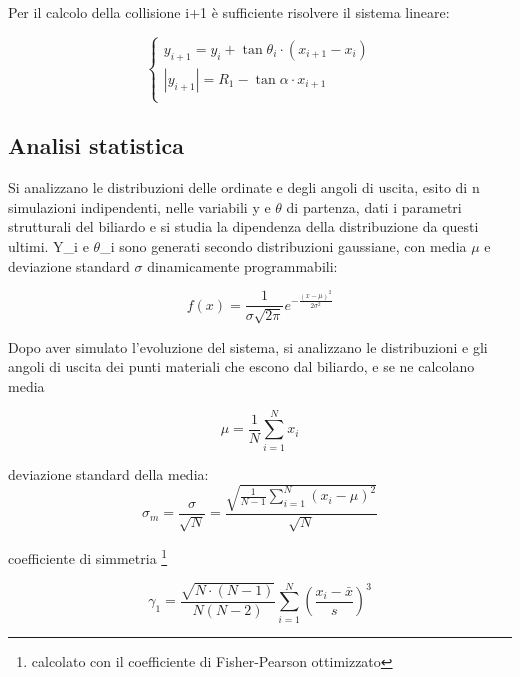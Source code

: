 \documentclass{article}
\begin{document}
Per il calcolo della collisione i+1 è sufficiente risolvere il sistema lineare:

\begin{equation}
\left\{
\begin{aligned}
    y_{i+1}=y_i+\tan\theta_i \cdot (x_{i+1}-x_i) \\
    |y_{i+1}|= R_1 - \tan\alpha \cdot x_{i+1}
\\
\end{aligned}
\right.
\end{equation}

\subsection{Analisi statistica}

Si analizzano le distribuzioni delle ordinate e degli angoli di uscita, esito di n simulazioni indipendenti, nelle variabili y e \(\theta\) di partenza, dati i parametri strutturali del biliardo e si studia la dipendenza della distribuzione da questi ultimi.
Y\_i e \(\theta\)\_i sono generati secondo distribuzioni gaussiane, con media \(\mu\) e deviazione standard \(\sigma\) dinamicamente programmabili:

\begin{equation}
    f(x) = \frac{1}{\sigma\sqrt{2\pi}} e^{-\frac{(x-\mu)^2}{2\sigma^2}}
\end{equation}

Dopo aver simulato l'evoluzione del sistema, si analizzano le distribuzioni e gli angoli di uscita dei punti materiali che escono dal biliardo, e se ne calcolano media

\begin{equation}
    \mu = \frac{1}{N} \sum_{i=1}^N x_i
\end{equation}

deviazione standard della media:
\begin{equation}
    \sigma_m = \frac{\sigma}{\sqrt{N}} = \frac{\sqrt{\frac{1}{N-1} \sum_{i=1}^N (x_i - \mu)^2}}{\sqrt{N}}
\end{equation}



coefficiente di simmetria
\footnote{calcolato con il coefficiente di Fisher-Pearson ottimizzato}

\begin{equation}
    \gamma_1 = \frac{\sqrt{N\cdot (N-1)}}{N(N-2)} \sum_{i=1}^N \left(\frac{x_i - \bar{x}}{s}\right)^3
\end{equation}
\end{document}
